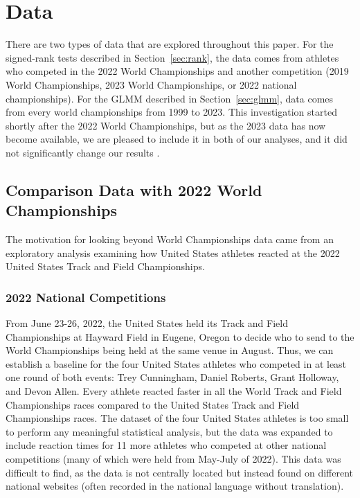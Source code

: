 \documentclass[12pt, letterpaper]{article}
\begin{document}
\section{Data} \label{sec:Data}

There are two types of data that are explored throughout this paper. For the
signed-rank tests described in Section~\ref{sec:rank}, the data comes from 
athletes who competed in the 2022 World Championships and another competition 
(2019 World Championships, 2023 World Championships, or 2022 national 
championships). For the GLMM described in Section~\ref{sec:glmm}, data comes
from every world championships from 1999 to 2023. This investigation started 
shortly after the 2022 World Championships, but as the 2023 data has now become 
available, we are pleased to include it in both of our analyses, and it did not
significantly change our results \citep{WAData}. 


\subsection{Comparison Data with 2022 World Championships}
\label{sec:databeyond}

The motivation for looking beyond World Championships data came from an 
exploratory analysis examining how United States athletes reacted at the 
2022 United States Track and Field Championships.


\subsubsection{2022 National Competitions}\label{sec:datanational}
From June 23-26, 2022, the United States held its Track and Field Championships 
at Hayward Field in Eugene, Oregon to decide who to send to the World 
Championships being held at the same venue in August. Thus, we can establish a 
baseline for the four United States athletes who competed in at least one round 
of both events: Trey Cunningham, Daniel Roberts, Grant Holloway, and Devon Allen.  
Every athlete reacted faster in all the World Track and Field Championships 
races compared to the United States Track and Field Championships races. The 
dataset of the four United States athletes is too small to perform any 
meaningful statistical analysis, but the data was expanded to include reaction 
times for 11 more athletes who competed at other national competitions (many of which were 
held from May-July of 2022). This data was difficult to find, as the data is not
centrally located but instead found on different national websites (often 
recorded in the national language without translation).
\end{document}
